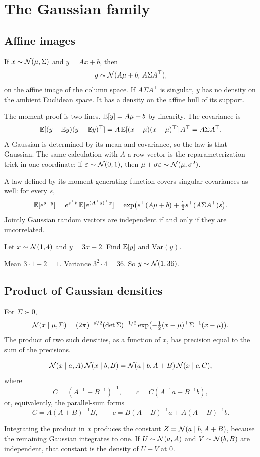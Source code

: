 \chapter{The Gaussian family}
\label{ch:gauss}

\section{Affine images}

\begin{resultbox}
If $x\sim\mathcal{N}(\mu,\Sigma)$ and $y=Ax+b$, then
\[
y\sim\mathcal{N}(A\mu+b,\, A\Sigma A^\top),
\]
on the affine image of the column space. If $A\Sigma A^\top$ is singular, $y$ has no density on the ambient Euclidean space. It has a density on the affine hull of its support.
\end{resultbox}

The moment proof is two lines. $\mathbb{E}[y]=A\mu+b$ by linearity. The covariance is
\[
\mathbb{E}[(y-\mathbb{E} y)(y-\mathbb{E} y)^\top]=A\,\mathbb{E}[(x-\mu)(x-\mu)^\top]\,A^\top=A\Sigma A^\top.
\]
A Gaussian is determined by its mean and covariance, so the law is that Gaussian. The same calculation with $A$ a row vector is the reparameterization trick in one coordinate: if $\varepsilon\sim\mathcal{N}(0,1)$, then $\mu+\sigma\varepsilon\sim\mathcal{N}(\mu,\sigma^2)$.

A law defined by its moment generating function covers singular covariances as well: for every $s$,
\[
\mathbb{E}[e^{s^\top y}]=e^{s^\top b}\,\mathbb{E}[e^{(A^\top s)^\top x}]
=\exp\bigl(s^\top(A\mu+b)+\tfrac12 s^\top(A\Sigma A^\top)s\bigr).
\]
Jointly Gaussian random vectors are independent if and only if they are uncorrelated.

\begin{practbox}
Let $x\sim\mathcal{N}(1,4)$ and $y=3x-2$. Find $\mathbb{E}[y]$ and $\mathrm{Var}(y)$.
\end{practbox}
\begin{solbox}
Mean $3\cdot 1-2=1$. Variance $3^2\cdot 4=36$. So $y\sim\mathcal{N}(1,36)$.
\end{solbox}

\section{Product of Gaussian densities}

For $\Sigma\succ 0$,
\[
\mathcal{N}(x\mid\mu,\Sigma)=(2\pi)^{-d/2}(\det\Sigma)^{-1/2}\exp\bigl(-\tfrac12(x-\mu)^\top\Sigma^{-1}(x-\mu)\bigr).
\]
The product of two such densities, as a function of $x$, has precision equal to the sum of the precisions.
\begin{resultbox}
\[
\mathcal{N}(x\mid a,A)\,\mathcal{N}(x\mid b,B)=\mathcal{N}(a\mid b,A+B)\,\mathcal{N}(x\mid c,C),
\]
where
\[
C=(A^{-1}+B^{-1})^{-1},\qquad
c=C(A^{-1}a+B^{-1}b),
\]
or, equivalently, the parallel-sum forms
\[
C=A(A+B)^{-1}B,\qquad
c=B(A+B)^{-1}a+A(A+B)^{-1}b.
\]
\end{resultbox}
Integrating the product in $x$ produces the constant $Z=\mathcal{N}(a\mid b,A+B)$, because the remaining Gaussian integrates to one. If $U\sim\mathcal{N}(a,A)$ and $V\sim\mathcal{N}(b,B)$ are independent, that constant is the density of $U-V$ at $0$.

